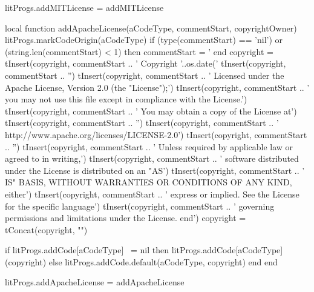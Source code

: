 litProgs.addMITLicense = addMITLicense

local function addApacheLicense(aCodeType, commentStart, copyrightOwner)
  litProgs.markCodeOrigin(aCodeType)
  if (type(commentStart) == 'nil') or (string.len(commentStart) < 1) then
    commentStart = '%
  end
  copyright = { }
  tInsert(copyright, commentStart ..
    ' Copyright '..os.date('%
  tInsert(copyright,  commentStart .. 
    '')
  tInsert(copyright, commentStart ..
    ' Licensed under the Apache License, Version 2.0 (the "License");')
  tInsert(copyright, commentStart ..
    ' you may not use this file except in compliance with the License.')
  tInsert(copyright, commentStart ..
    ' You may obtain a copy of the License at')
  tInsert(copyright, commentStart ..
    '')
  tInsert(copyright, commentStart ..
    '    http://www.apache.org/licenses/LICENSE-2.0')
  tInsert(copyright, commentStart ..
    '')
  tInsert(copyright, commentStart ..
    ' Unless required by applicable law or agreed to in writing,')
  tInsert(copyright, commentStart ..
    ' software distributed under the License is distributed on an "AS')
  tInsert(copyright, commentStart ..
    ' IS" BASIS, WITHOUT WARRANTIES OR CONDITIONS OF ANY KIND, either')
  tInsert(copyright, commentStart ..
    ' express or implied. See the License for the specific language')
  tInsert(copyright, commentStart ..
    ' governing permissions and limitations under the License. end')
  copyright = tConcat(copyright, "\n")

  if litProgs.addCode[aCodeType] ~= nil then
    litProgs.addCode[aCodeType](copyright)
  else
    litProgs.addCode.default(aCodeType, copyright)
  end
end

litProgs.addApacheLicense = addApacheLicense
\stopLuaCode

\startMkIVCode
\unexpanded\def\setLitProgsOriginMarker{
  \dotripleempty\doSetLitProgsOriginMarker%
}

\unexpanded{}

